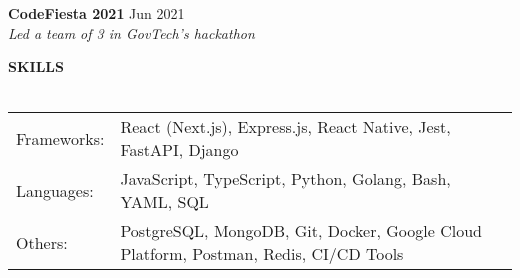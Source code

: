\documentclass[a4paper]{article}
\newcommand{\lineunder} {
    \vspace*{-8pt} \\
    \hspace*{-12pt} \hrulefill \\
}
\newcommand{\header} [1] {
    {\hspace*{-12pt}\vspace*{6pt} \large\textbf{#1}}
    \vspace*{-6pt} \lineunder
}
\begin{document}
\vspace{2mm}

\textbf{CodeFiesta 2021} \hfill Jun 2021\\
\textit{Led a team of 3 in GovTech's hackathon}\\

\vspace{2mm}

\header{SKILLS}
\vspace{1mm}
\begin{tabular}{ l l }
	Frameworks: & React (Next.js), Express.js, React Native, Jest, FastAPI, Django              \\
	Languages:  & JavaScript, TypeScript, Python, Golang, Bash, YAML, SQL                                \\
	Others:     & PostgreSQL, MongoDB, Git, Docker, Google Cloud Platform, Postman, Redis, CI/CD Tools   \\
\end{tabular}
\end{document}
